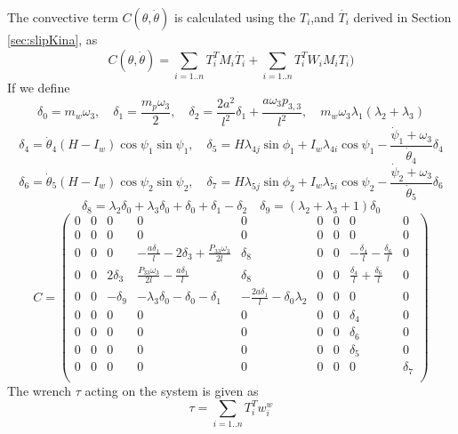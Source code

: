 {The convective term $C(\theta,\dot{\theta})$ is calculated using the $T_i$,and $\dot{T_i}$ derived in Section \ref{sec:slipKina}, as
\begin{equation}
C(\theta,\dot{\theta})=\sum_{i=1..n}T_i^T M_i\dot{T_i}+ \sum_{i=1..n}T_i^T W_i M_i T_i)\end{equation}
If we define
\[ \delta_0=m_w\omega_3, \quad \delta_1= \frac{m_p \omega_3}{2}, \quad \delta_2=\frac{2a^2}{l^2}\delta_1+\frac{a \omega_3 p_{3,3}}{l^2}, \quad m_w\omega_3 \lambda_1(\lambda_2+\lambda_3)\]
\[ \delta_4 = \dot\theta_4 (H-I_w)\cos{\psi_1}\sin{\psi_1},\quad \delta_5=H\lambda_{4j}\sin{\phi_1}+I_w \lambda_{4i}\cos{\psi_1}-\frac{\dot \psi_1+\omega_3}{\dot\theta_4}\delta_4  \]
\[ \delta_6 = \dot\theta_5 (H-I_w)\cos{\psi_2}\sin{\psi_2},\quad \delta_7=H\lambda_{5j}\sin{\phi_2}+I_w \lambda_{5i}\cos{\psi_2}-\frac{\dot \psi_2+\omega_3}{\dot\theta_5}\delta_6  \]
\[\delta_8=\lambda _2 \delta _0+\lambda _3 \delta _0+\delta _0+\delta _1-\delta _2 \quad \delta_9=(\lambda _2+\lambda _3 +1)\delta _0  \]
\[ C=
\left(
\begin{array}{ccccccccc}
 0 & 0 & 0 & 0 & 0 & 0 & 0 & 0 & 0 \\
 0 & 0 & 0 & 0 & 0 & 0 & 0 & 0 & 0 \\
 0 & 0 & 0 & -\frac{a \delta _1}{l}-2 \delta _3+\frac{P_{33} \omega _3}{2 l} & \delta_8 & 0 & 0 & -\frac{\delta _4}{l}-\frac{\delta _6}{l} & 0 \\
 0 & 0 & 2 \delta _3 & \frac{P_{33} \omega _3}{2 l}-\frac{a \delta _1}{l} & \delta_8 & 0 & 0 & \frac{\delta _4}{l}+\frac{\delta _6}{l} & 0 \\
 0 & 0 & -\delta_9& -\lambda _3 \delta _0-\delta _0-\delta _1 & -\frac{2 a \delta _1}{l}-\delta _0 \lambda _2 & 0 & 0 & 0 & 0 \\
 0 & 0 & 0 & 0 & 0 & 0 & 0 & \delta _4 & 0 \\
 0 & 0 & 0 & 0 & 0 & 0 & 0 & \delta _6 & 0 \\
 0 & 0 & 0 & 0 & 0 & 0 & 0 & \delta _5 & 0 \\
 0 & 0 & 0 & 0 & 0 & 0 & 0 & 0 & \delta _7 \\
\end{array}
\right)\]
The wrench $\tau$ acting on the system is given as 
\begin{equation}
\label{eqn:slipTauSum}
\tau=\sum_{i=1..n}T_i^T w^w_i
\end{equation}
\begin{figure}
	\begin{minipage}[t]{0.5\textwidth}
		\centering

\end{minipage}
\end{figure}}
